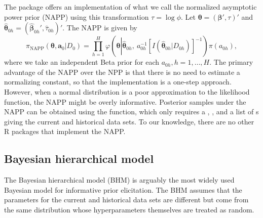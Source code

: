 The  package offers an implementation of what we call the normalized asymptotic power prior (NAPP) using this transformation $\tau = \log \phi$. Let $\bm{\theta} = (\bm{\beta}', \tau)'$ and $\hat{\bm{\theta}}_{0h} = (\hat{\bm{\beta}}_{0h}', \hat{\tau}_{0h})'$. The NAPP is given by
$$
\pi_{\text{NAPP}}(\bm{\theta}, \bm{a}_0 | D_0) = \prod_{h=1}^H \varphi\left( \bm{\theta} \left| \hat{\bm{\theta}}_{0h}, ~a_{0h}^{-1} [I(\hat{\bm{\theta}}_{0h} | D_{0h})]^{-1}\right) \right. \pi(a_{0h}),
$$
where we take an independent Beta prior for each $a_{0h}, h = 1, \ldots, H$.
The primary advantage of the NAPP over the NPP is that there is no need to estimate a normalizing constant, so that the implementation is a one-step approach. However, when a normal distribution is a poor approximation to the likelihood function, the NAPP might be overly informative. Posterior samples under the NAPP can be obtained using the  function, which only requires a , , and a list of s giving the current and historical data sets. To our knowledge, there are no other R packages that implement the NAPP.

\subsection{Bayesian hierarchical model}
\label{sec:bhm}

The Bayesian hierarchical model (BHM) is arguably the most widely used Bayesian model for informative prior elicitation.
The BHM assumes that the parameters for the current and historical data sets are different but come from the same distribution whose hyperparameters themselves are treated as random.

